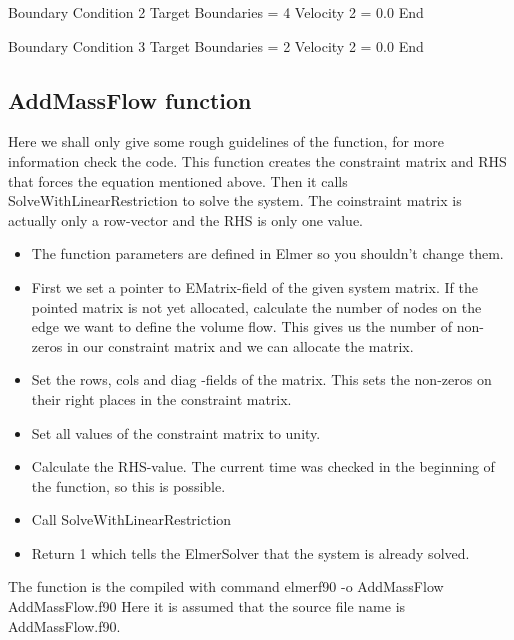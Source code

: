 Boundary Condition 2
  Target Boundaries = 4
  Velocity 2 = 0.0
End

Boundary Condition 3
  Target Boundaries = 2
  Velocity 2 = 0.0
End
\ttend
\subsection*{AddMassFlow function}
Here we shall only give some rough guidelines of the function, for more information
check the code. This function creates the constraint matrix and RHS that forces the
equation mentioned above. Then it calls SolveWithLinearRestriction to solve the system.
The coinstraint matrix is actually only a row-vector and the RHS is only one value. 
\begin{itemize}
\item The function parameters are defined in Elmer so you shouldn't change them.
\item First we set a pointer to EMatrix-field of the given system matrix.
If the pointed matrix is not yet allocated, calculate the number of nodes
on the edge we want to define the volume flow. This gives us the number of non-zeros
in our constraint matrix and we can allocate the matrix.
\item Set the rows, cols and diag -fields of the matrix. This sets the non-zeros
on their right places in the constraint matrix.
\item Set all values of the constraint matrix to unity.
\item Calculate the RHS-value. The current time was checked in the beginning 
of the function, so this is possible.
\item Call SolveWithLinearRestriction
\item Return 1 which tells the ElmerSolver that the system is already solved.
\end{itemize} 
The function is the compiled with command
\ttbegin
elmerf90 -o AddMassFlow AddMassFlow.f90 
\ttend
Here it is assumed that the source file name is AddMassFlow.f90.

